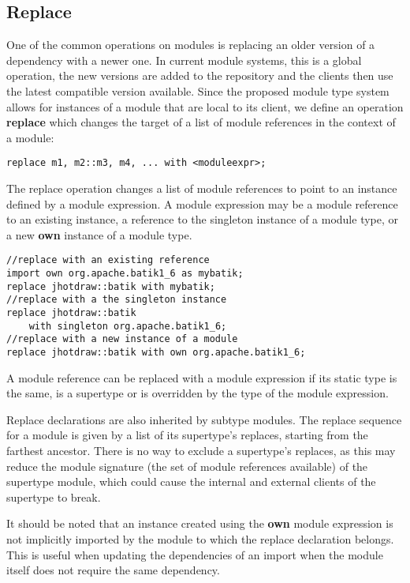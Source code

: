 \subsection{Replace}

One of the common operations on modules is replacing an older version of a
dependency with a newer one. In current module systems, this is a global operation,
the new versions are added to the repository and the clients then use the latest
compatible version available. Since the proposed module type system allows for instances
of a module that are local to its client, we define an operation \textbf{replace} which
changes the target of a list of module references in the context of a module:

\begin{lstlisting}
replace m1, m2::m3, m4, ... with <moduleexpr>;
\end{lstlisting}

The replace operation changes a list of module references to point to an instance
defined by a module expression. A module expression may be a module reference to
an existing instance, a reference to the singleton instance of a module type, or
a new \textbf{own} instance of a module type.

\begin{lstlisting}[caption=Module Expressions for Replace]
//replace with an existing reference
import own org.apache.batik1_6 as mybatik;
replace jhotdraw::batik with mybatik;
//replace with a the singleton instance
replace jhotdraw::batik 
	with singleton org.apache.batik1_6;
//replace with a new instance of a module
replace jhotdraw::batik with own org.apache.batik1_6;
\end{lstlisting}

A module reference can be replaced with a module expression if its static type
is the same, is a supertype or is overridden by the type of the module expression.

Replace declarations are also inherited by subtype modules. The replace sequence for a
module is given by a list of its supertype's replaces, starting from the farthest
ancestor. There is no way to exclude a supertype's replaces, as
this may reduce the module signature (the set of module references available) of
the supertype module, which could cause the internal and external clients of
the supertype to break.

It should be noted that an instance created using the \textbf{own} module expression is not
implicitly imported by the module to which the replace declaration belongs. This
is useful when updating the dependencies of an import when the module itself
does not require the same dependency.

